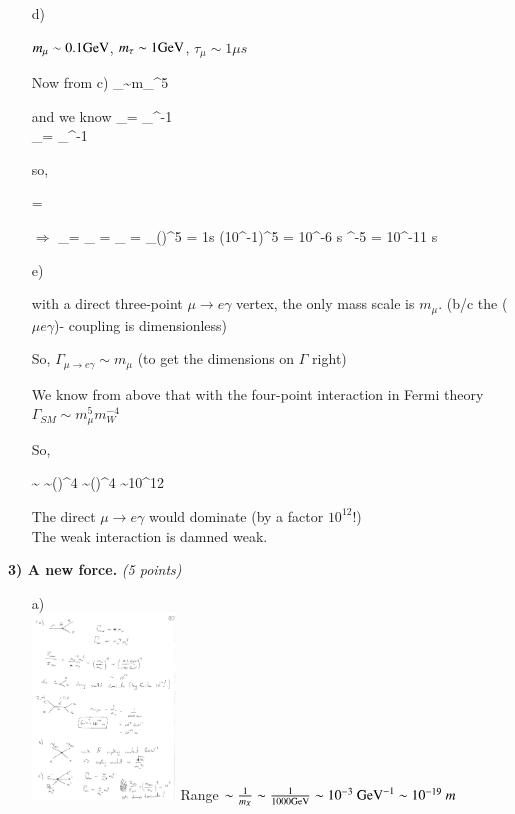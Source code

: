 {\begin{itemize}
{\be
\Gamma \sim |M|^2 \sim  {}^2 = \GeV^{-4}
\ee
}
But we also know that $\Gamma$ has to come out to have overall dimensions of $\frac{1}{\rmt{time}}$ or \GeV.

$\Rightarrow$  
\be
\Gamma \sim m_\mu^5
\ee

\item[d)]{
$m_\mu \sim 0.1 \textrm{GeV}$, $m_\tau \sim 1 \textrm{GeV}$, $\tau_\mu \sim 1\mu s$

Now from c) 
\be
\Gamma_\tau \sim m_\tau^5
\ee

and we know
\bea
\tau_\mu = \Gamma_\mu^{-1}\\
\tau_\tau = \Gamma_\tau^{-1}
\eea

so, 

\be
\frac{\tau_\tau}{\tau_\mu} = \frac{\Gamma_\mu}{\Gamma_\tau}
\ee

$\Rightarrow$
\be
\tau_\tau = \tau_\mu \frac{\Gamma_\mu}{\Gamma_\tau} = \tau_\mu {} = \tau_\mu \left(\right)^5  = 1\mu s (10^{-1})^5 = 10^{-6} s ^{-5} = 10^{-11} s
\ee
}

\item[e)]{
with a direct three-point $\mu \rightarrow e \gamma$ vertex, the only mass scale is $m_\mu$. (b/c the ($\mu e \gamma$)- coupling  is dimensionless)

So, $\Gamma_{\mu\rightarrow e \gamma} \sim m_\mu$ (to get the dimensions on $\Gamma$ right)

We know from above that with the four-point interaction in Fermi theory $\Gamma_{SM} \sim m_\mu^5 m_W^{-4}$

So,

\be
{} \sim {} \sim \left(\right)^4 \sim \left(\right)^4  \sim 10^{12}
\ee

The direct $\mu \rightarrow e \gamma$ would dominate (by a factor  $10^{12}$!)\\
The weak interaction is damned weak.

}
\end{itemize}

\clearpage

%
%
\textbf{3) A new force. } \hfill \textit{(5 points)}\\

\begin{itemize}
\item[a)]{ ${ }$\\
\bc
\includegraphics[width=0.3\textwidth]{./eeXee.pdf}
\ec
Range $\sim \frac{1}{m_X} \sim \frac{1}{1000 \textrm{GeV}} \sim 10^{-3}\ \textrm{GeV}^{-1} \sim 10^{-19}\ m$
}


\end{itemize}}
